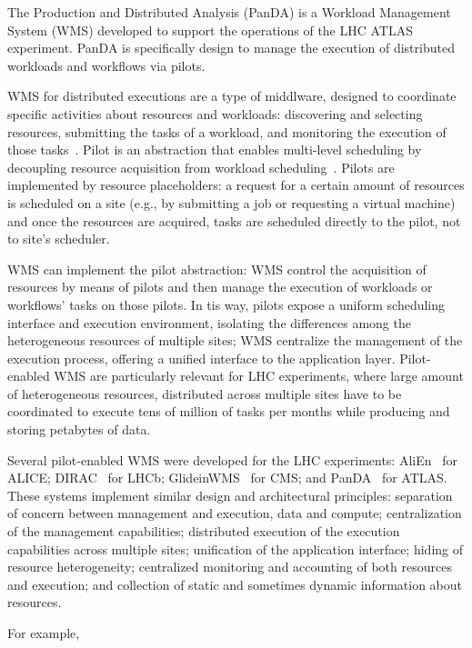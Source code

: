 The Production and Distributed Analysis (PanDA) is a Workload Management System
(WMS) developed to support the operations of the LHC ATLAS experiment. PanDA is
specifically design to manage the execution of distributed workloads and
workflows via pilots.

WMS for distributed executions are a type of middlware, designed to coordinate
specific activities about resources and workloads: discovering and selecting
resources, submitting the tasks of a workload, and monitoring the  execution of
those tasks~\cite{marco2009glite}. Pilot is an abstraction that enables
multi-level scheduling by decoupling resource acquisition from workload
scheduling~\cite{turilli2015comprehensive}. Pilots are implemented by resource
placeholders: a request for a certain amount of resources is scheduled on a site
(e.g., by submitting a job or requesting a virtual machine) and once the
resources are acquired, tasks are scheduled directly to the pilot, not to site's
scheduler.

WMS can implement the pilot abstraction: WMS control the acquisition of
resources by means of pilots and then manage the execution of workloads or
workflows' tasks on those pilots. In tis way, pilots expose a uniform scheduling
interface and execution environment, isolating the differences among the
heterogeneous resources of multiple sites; WMS centralize the management of the
execution process, offering a unified interface to the application layer.
Pilot-enabled WMS are particularly relevant for LHC experiments, where large
amount of heterogeneous resources, distributed across multiple sites have to be
coordinated to execute tens of million of tasks per months while producing and
storing petabytes of data.

Several pilot-enabled WMS were developed for the LHC experiments:
AliEn~\cite{Bagnasco2010} for ALICE; DIRAC~\cite{Paterson2010} for LHCb;
GlideinWMS~\cite{sfiligoi2008glideinwms} for CMS; and
PanDA~\cite{maeno2014evolution} for ATLAS. These systems implement similar
design and architectural principles: separation of concern between management
and execution, data and compute; centralization of the management capabilities;
distributed execution of the execution capabilities across multiple sites;
unification of the application interface; hiding of resource heterogeneity;
centralized monitoring and accounting of both resources and execution; and
collection of static and sometimes dynamic information about resources.

For example, 

